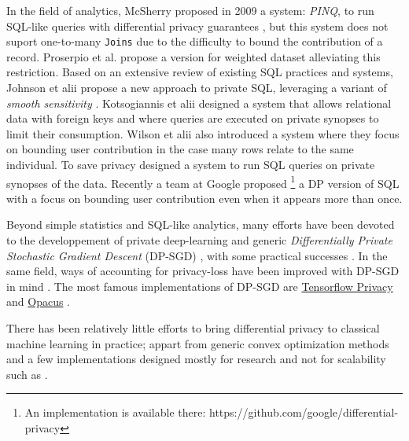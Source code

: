 \documentclass{article}
\theoremstyle{definition}
\begin{document}
In the field of analytics, McSherry proposed in 2009 a system: \emph{PINQ}, to run SQL-like queries
with differential privacy guarantees \cite{mcsherry2009privacy}, but this system does not suport
one-to-many \verb"Joins" due to the difficulty to bound the contribution of a record.
Proserpio et al. \cite{proserpio2012calibrating} propose a version for weighted dataset alleviating
this restriction.
Based on an extensive review of existing SQL practices and systems, Johnson et alii \cite{johnson2018towards}
propose a new approach to private SQL, leveraging a variant of \emph{smooth sensitivity} \cite{nissim2007smooth}.
Kotsogiannis et alii \cite{kotsogiannis2019privatesql, kotsogiannis2019architecting} designed a system that allows
relational data with foreign keys and where queries are executed on private synopses to limit their consumption.
Wilson et alii also introduced a system \cite{wilson2019differentially} where they focus on bounding user contribution
in the case many rows relate to the same individual.
To save privacy \cite{kotsogiannis2019privatesql, kotsogiannis2019architecting} designed a system to run SQL queries
on private synopses of the data.
Recently a team at Google proposed \footnote{An implementation is available there: https://github.com/google/differential-privacy}
a DP version of SQL \cite{wilson2019differentially} with a focus on bounding user contribution even when it appears more than once.

Beyond simple statistics and SQL-like analytics, many efforts have been devoted to the developpement of
private deep-learning and generic \emph{Differentially Private Stochastic Gradient Descent} (DP-SGD)
\cite{abadi2016deep, papernot2018scalable, kairouz2021practical}, with some practical successes \cite{mcmahan2017learning}.
In the same field, ways of accounting for privacy-loss have been improved with DP-SGD in mind \cite{mironov2017renyi, bu2020deep}.
The most famous implementations of DP-SGD are \href{https://github.com/tensorflow/privacy}{Tensorflow Privacy} \cite{mcmahan2018general}
and \href{https://github.com/pytorch/opacus}{Opacus} \cite{opacus}.

There has been relatively little efforts to bring differential privacy to classical machine learning in practice;
appart from generic convex optimization methods \cite{wu2017bolt, iyengar2019towards} and a few implementations
designed mostly for research and not for scalability such as \cite{diffprivlib}.
\end{document}
